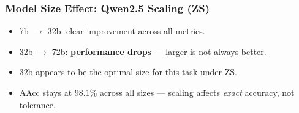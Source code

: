 \documentclass[aspectratio=169]{beamer}
\begin{document}
\begin{frame}
    \frametitle{Model Size Effect: Qwen2.5 Scaling (ZS)}
    {}
    \vspace{0.5em}
    \begin{itemize}
        \item 7b $\rightarrow$ 32b: clear improvement across all metrics.
        \item 32b $\rightarrow$ 72b: \textbf{performance drops} --- larger is not always better.
        \item 32b appears to be the optimal size for this task under ZS.
        \item AAcc stays at 98.1\% across all sizes --- scaling affects \emph{exact} accuracy, not tolerance.
    \end{itemize}
\end{frame}
\end{document}
